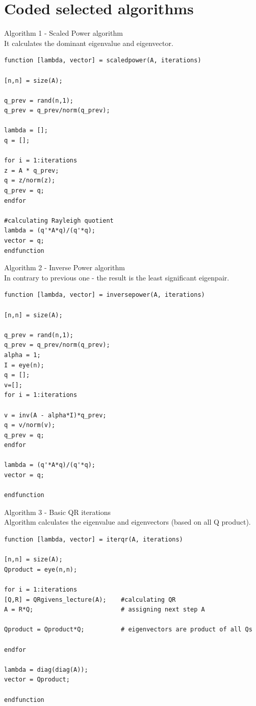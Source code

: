 \documentclass[eng,openany]{mgr}
\begin{document}
\section{Coded selected algorithms}
Algorithm 1 - Scaled Power algorithm\\
It calculates the dominant eigenvalue and eigenvector. 
\begin{lstlisting}
function [lambda, vector] = scaledpower(A, iterations)

[n,n] = size(A);

q_prev = rand(n,1);
q_prev = q_prev/norm(q_prev);

lambda = [];
q = [];

for i = 1:iterations
z = A * q_prev;
q = z/norm(z);
q_prev = q;
endfor

#calculating Rayleigh quotient
lambda = (q'*A*q)/(q'*q);
vector = q;
endfunction
\end{lstlisting}
\newpage
Algorithm 2 - Inverse Power algorithm\\
In contrary to previous one - the result is the least significant eigenpair.
\begin{lstlisting}
function [lambda, vector] = inversepower(A, iterations)

[n,n] = size(A);

q_prev = rand(n,1);
q_prev = q_prev/norm(q_prev);
alpha = 1;
I = eye(n);
q = [];
v=[];
for i = 1:iterations

v = inv(A - alpha*I)*q_prev;
q = v/norm(v);
q_prev = q;
endfor

lambda = (q'*A*q)/(q'*q);
vector = q;

endfunction

\end{lstlisting}
Algorithm 3 - Basic QR iterations\\
Algorithm calculates the eigenvalue and eigenvectors (based on all Q product).
\begin{lstlisting}
function [lambda, vector] = iterqr(A, iterations)

[n,n] = size(A);
Qproduct = eye(n,n);

for i = 1:iterations
[Q,R] = QRgivens_lecture(A);    #calculating QR
A = R*Q;                		# assigning next step A

Qproduct = Qproduct*Q;    		# eigenvectors are product of all Qs

endfor

lambda = diag(diag(A));
vector = Qproduct;

endfunction
\end{lstlisting}
\end{document}
